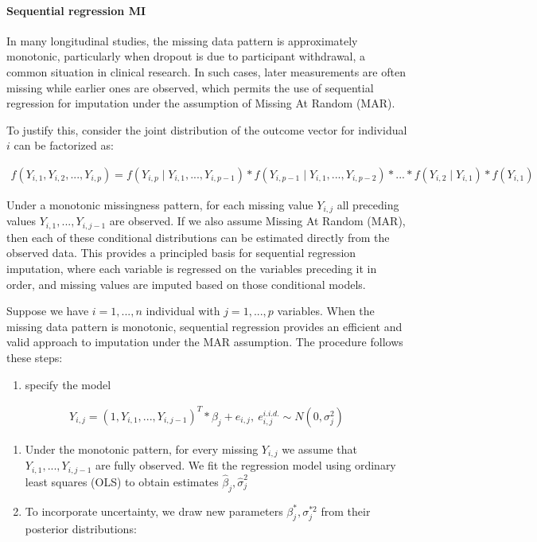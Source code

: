 \documentclass{article}
\providecommand{\tightlist}{%
  \setlength{\itemsep}{0pt}\setlength{\parskip}{0pt}}
\begin{document}
\paragraph{Sequential regression MI}\label{sequential-regression-mi}

In many longitudinal studies, the missing data pattern is approximately
monotonic, particularly when dropout is due to participant withdrawal, a
common situation in clinical research. In such cases, later measurements
are often missing while earlier ones are observed, which permits the use
of sequential regression for imputation under the assumption of Missing
At Random (MAR).

To justify this, consider the joint distribution of the outcome vector
for individual \(i\) can be factorized as:

\begin{align*}
    f(Y_{i,1},Y_{i,2},...,Y_{i,p}) = f(Y_{i,p} \mid Y_{i,1},...,Y_{i,p-1}) * 
    f(Y_{i,p-1} \mid Y_{i,1},...,Y_{i,p-2}) * ... * f(Y_{i,2} \mid Y_{i,1}) 
    * f(Y_{i,1})
    \end{align*}

Under a monotonic missingness pattern, for each missing value
\(Y_{i,j}\) all preceding values \(Y_{i,1},...,Y_{i,j-1}\) are observed.
If we also assume Missing At Random (MAR), then each of these
conditional distributions can be estimated directly from the observed
data. This provides a principled basis for sequential regression
imputation, where each variable is regressed on the variables preceding
it in order, and missing values are imputed based on those conditional
models.

Suppose we have \(i=1,...,n\) individual with \(j=1,...,p\) variables.
When the missing data pattern is monotonic, sequential regression
provides an efficient and valid approach to imputation under the MAR
assumption. The procedure follows these steps:

\begin{enumerate}
\def\labelenumi{\arabic{enumi}.}
\tightlist
\item
  specify the model
\end{enumerate}

\begin{align*}    
    Y_{i,j} = (1,Y_{i,1},...,Y_{i,j-1})^{T} * \beta_{j} + 
    e_{i,j},\ {e_{i,j}^{i.i.d.} \sim{N} (0,\sigma^{2}_{j})}
    \end{align*}

\begin{enumerate}
\def\labelenumi{\arabic{enumi}.}
\setcounter{enumi}{1}
\item
  Under the monotonic pattern, for every missing \(Y_{i,j}\) we assume
  that \(Y_{i,1},...,Y_{i,j-1}\) are fully observed. We fit the
  regression model using ordinary least squares (OLS) to obtain
  estimates \(\hat{\beta}_{j},\hat{\sigma}_{j}^{2}\)
\item
  To incorporate uncertainty, we draw new parameters
  \(\beta_{j}^{*},\sigma_{j}^{*2}\) from their posterior distributions:
\end{enumerate}
\end{document}
